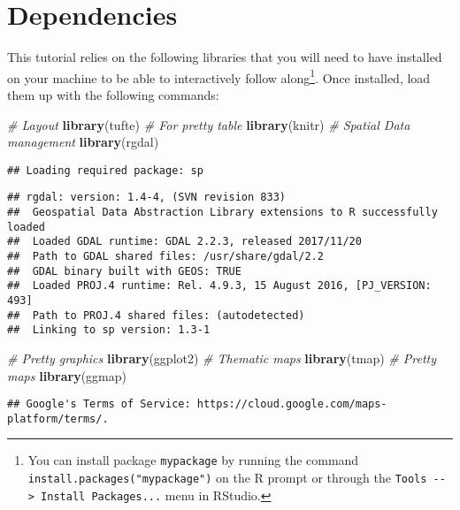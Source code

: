 \documentclass[]{book}
\newenvironment{Shaded}{\begin{snugshade}}{\end{snugshade}}
\newcommand{\CommentTok}[1]{\textcolor[rgb]{0.56,0.35,0.01}{\textit{#1}}}
\newcommand{\KeywordTok}[1]{\textcolor[rgb]{0.13,0.29,0.53}{\textbf{#1}}}
\newcommand{\NormalTok}[1]{#1}
\let\rmarkdownfootnote\footnote%
\def\footnote{\protect\rmarkdownfootnote}
\begin{document}
\hypertarget{dependencies}{%
\section{Dependencies}\label{dependencies}}

This tutorial relies on the following libraries that you will need to have installed on your machine to be able to interactively follow along\footnote{You can install package \texttt{mypackage} by running the command \texttt{install.packages("mypackage")} on the R prompt or through the \texttt{Tools\ -\/-\textgreater{}\ Install\ Packages...} menu in RStudio.}. Once installed, load them up with the following commands:

\begin{Shaded}
\begin{Highlighting}[]
\CommentTok{# Layout}
\KeywordTok{library}\NormalTok{(tufte)}
\CommentTok{# For pretty table}
\KeywordTok{library}\NormalTok{(knitr)}
\CommentTok{# Spatial Data management}
\KeywordTok{library}\NormalTok{(rgdal)}
\end{Highlighting}
\end{Shaded}

\begin{verbatim}
## Loading required package: sp
\end{verbatim}

\begin{verbatim}
## rgdal: version: 1.4-4, (SVN revision 833)
##  Geospatial Data Abstraction Library extensions to R successfully loaded
##  Loaded GDAL runtime: GDAL 2.2.3, released 2017/11/20
##  Path to GDAL shared files: /usr/share/gdal/2.2
##  GDAL binary built with GEOS: TRUE 
##  Loaded PROJ.4 runtime: Rel. 4.9.3, 15 August 2016, [PJ_VERSION: 493]
##  Path to PROJ.4 shared files: (autodetected)
##  Linking to sp version: 1.3-1
\end{verbatim}

\begin{Shaded}
\begin{Highlighting}[]
\CommentTok{# Pretty graphics}
\KeywordTok{library}\NormalTok{(ggplot2)}
\CommentTok{# Thematic maps}
\KeywordTok{library}\NormalTok{(tmap)}
\CommentTok{# Pretty maps}
\KeywordTok{library}\NormalTok{(ggmap)}
\end{Highlighting}
\end{Shaded}

\begin{verbatim}
## Google's Terms of Service: https://cloud.google.com/maps-platform/terms/.
\end{verbatim}
\end{document}
